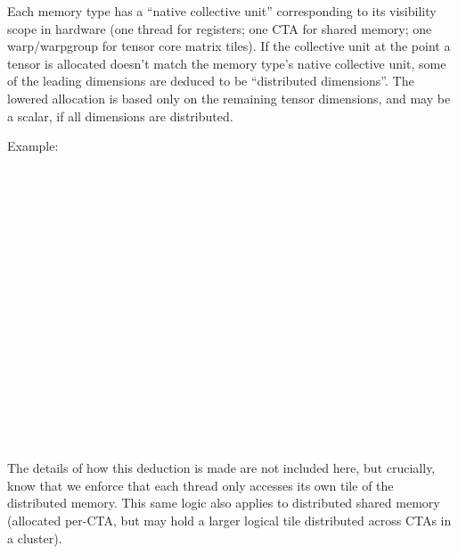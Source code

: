 \filbreak
Each memory type has a ``native collective unit'' corresponding to its visibility scope in hardware (one thread for registers; one CTA for shared memory; one warp/warpgroup for tensor core matrix tiles).
If the collective unit at the point a tensor is allocated doesn't match the memory type's native collective unit, some of the leading dimensions are deduced to be ``distributed dimensions''.
The lowered allocation is based only on the remaining tensor dimensions, and may be a scalar, if all dimensions are distributed.

\filbreak
Example:

\\
\\
\\
\\
\\
\\
\\
\\
 \\
\\
\\
\\
\\
\\
\\
\\

\filbreak
The details of how this deduction is made are not included here, but crucially, know that we enforce that each thread only accesses its own tile of the distributed memory.
This same logic also applies to distributed shared memory (allocated per-CTA, but may hold a larger logical tile distributed across CTAs in a cluster).

\filbreak
{}

\filbreak
{}


